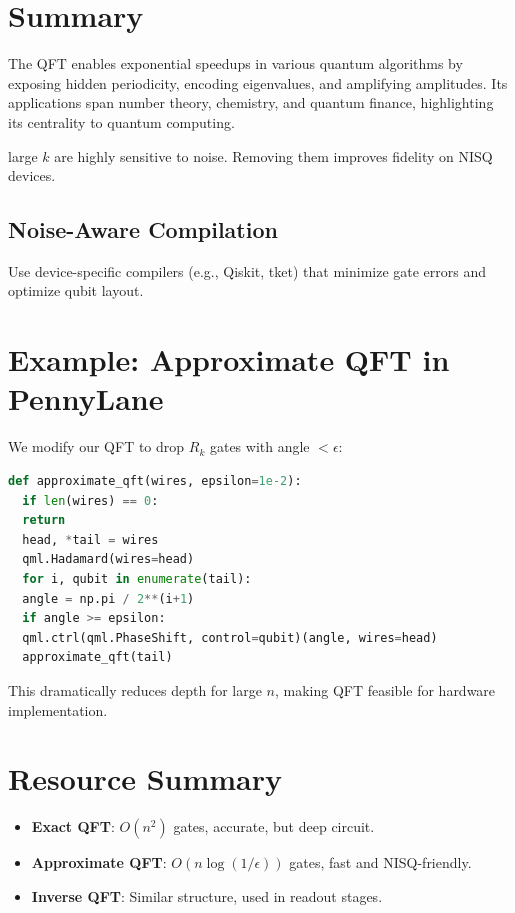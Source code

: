 \documentclass[12pt]{book}
\begin{document}
\section{Summary}
The QFT enables exponential speedups in various quantum algorithms by exposing hidden periodicity, encoding eigenvalues, and amplifying amplitudes. Its applications span number theory, chemistry, and quantum finance, highlighting its centrality to quantum computing.


large $k$ are highly sensitive to noise. Removing them improves fidelity on NISQ devices.

\subsection*{Noise-Aware Compilation}
Use device-specific compilers (e.g., Qiskit, tket) that minimize gate errors and optimize qubit layout.

\section{Example: Approximate QFT in PennyLane}
We modify our QFT to drop $R_k$ gates with angle $< \epsilon$:

\begin{lstlisting}[language=Python]
  def approximate_qft(wires, epsilon=1e-2):
  if len(wires) == 0:
  return
  head, *tail = wires
  qml.Hadamard(wires=head)
  for i, qubit in enumerate(tail):
  angle = np.pi / 2**(i+1)
  if angle >= epsilon:
  qml.ctrl(qml.PhaseShift, control=qubit)(angle, wires=head)
  approximate_qft(tail)
\end{lstlisting}

This dramatically reduces depth for large $n$, making QFT feasible for hardware implementation.

\section{Resource Summary}

\begin{itemize}
\item \textbf{Exact QFT}: $O(n^2)$ gates, accurate, but deep circuit.
\item \textbf{Approximate QFT}: $O(n \log(1/\epsilon))$ gates, fast and NISQ-friendly.
\item \textbf{Inverse QFT}: Similar structure, used in readout stages.
\end{itemize}
\end{document}
